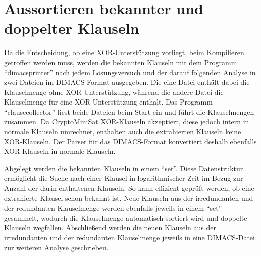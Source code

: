 \section{Aussortieren bekannter und doppelter Klauseln}
\label{sec:ana:rem_double}

Da die Entscheidung, ob eine XOR-Unterstützung vorliegt, beim Kompilieren getroffen werden muss, werden die bekannten Klauseln
mit dem Programm "`dimacsprinter"' nach jedem Lösungsversuch und der darauf folgenden Analyse in zwei Dateien im DIMACS-Format
ausgegeben. Die eine Datei enthält dabei die Klauselmenge ohne XOR-Unterstützung, während die andere Datei die Klauselmenge für
eine XOR-Unterstützung enthält. Das Programm "`clausecollector"' liest beide Dateien beim Start ein und führt die Klauselmengen
zusammen. Da CryptoMiniSat XOR-Klauseln akzeptiert, diese jedoch intern in normale Klauseln umrechnet, enthalten auch die
extrahierten Klauseln keine XOR-Klauseln. Der Parser für das DIMACS-Format konvertiert deshalb ebenfalls XOR-Klauseln in normale
Klauseln.

Abgelegt werden die bekannten Klauseln in einem "`set"'. Diese Datenstruktur ermöglicht die Suche nach einer Klausel in logarithmischer
Zeit im Bezug zur Anzahl der darin enthaltenen Klauseln. So kann effizient geprüft werden, ob eine extrahierte Klausel schon bekannt ist.
Neue Klauseln aus der irredundanten und der redundanten Klauselmenge werden ebenfalls jeweils in einem "`set"' gesammelt, wodurch die
Klauselmenge automatisch sortiert wird und doppelte Klauseln wegfallen. Abschließend werden die neuen Klauseln aus der irredundanten und
der redundanten Klauselmenge jeweils in eine DIMACS-Datei zur weiteren Analyse geschrieben.